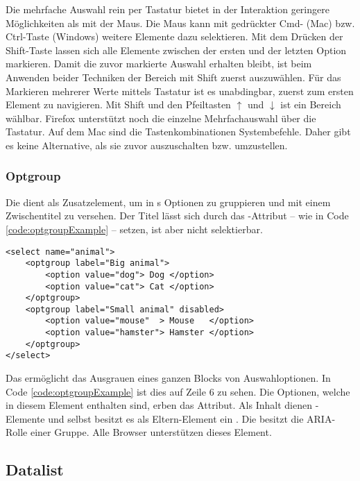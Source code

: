 Die mehrfache Auswahl rein per Tastatur bietet in der Interaktion geringere Möglichkeiten als mit der Maus. 
Die Maus kann mit gedrückter Cmd- (Mac) bzw. Ctrl-Taste (Windows) weitere Elemente dazu selektieren. 
Mit dem Drücken der Shift-Taste lassen sich alle Elemente zwischen der ersten und der letzten Option markieren. 
Damit die zuvor markierte Auswahl erhalten bleibt, ist beim Anwenden beider Techniken der Bereich mit Shift zuerst auszuwählen. 
Für das Markieren mehrerer Werte mittels Tastatur ist es unabdingbar, zuerst zum ersten Element zu navigieren. 
Mit Shift und den Pfeiltasten $\uparrow$ und $\downarrow$ ist ein Bereich wählbar. 
Firefox unterstützt noch die einzelne Mehrfachauswahl über die Tastatur. 
Auf dem Mac sind die Tastenkombinationen Systembefehle. 
Daher gibt es keine Alternative, als sie zuvor auszuschalten bzw. umzustellen. 


\subsubsection{\color{dblue} \color{dgray} Optgroup}
\label{sec:optgroup}

Die  dient als Zusatzelement, um in s Optionen zu gruppieren und mit einem Zwischentitel zu versehen. 
Der Titel lässt sich durch das -Attribut – wie in Code \ref{code:optgroupExample} – setzen, ist aber nicht selektierbar. 

\begin{lstlisting}[style = htmlcssjs, caption = Optgroup Beispiel, label = code:optgroupExample]
<select name="animal">
    <optgroup label="Big animal">
        <option value="dog"> Dog </option>
        <option value="cat"> Cat </option>
    </optgroup>
    <optgroup label="Small animal" disabled>
        <option value="mouse"  > Mouse   </option>
        <option value="hamster"> Hamster </option>
    </optgroup>
</select>
\end{lstlisting}

Das  ermöglicht das Ausgrauen eines ganzen Blocks von Auswahloptionen. 
In Code \ref{code:optgroupExample} ist dies auf Zeile 6 zu sehen. 
Die Optionen, welche in diesem Element enthalten sind, erben das Attribut. 
Als Inhalt dienen -Elemente und selbst besitzt es als Eltern-Element ein . 
Die  besitzt die ARIA-Rolle einer Gruppe. 
Alle Browser unterstützen dieses Element. 


\subsection{Datalist}
\label{sec:datalist}


